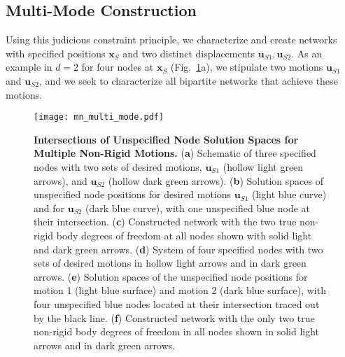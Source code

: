 \documentclass[%
preprint,
 amsmath,amssymb,
 aps,
]{revtex4-1}
\begin{document}
\subsection{Multi-Mode Construction}

Using this judicious constraint principle, we characterize and create networks with specified positions $\bm{x}_S$ and two distinct displacements $\bm{u}_{S1}, \bm{u}_{S2}$. As an example in $d = 2$ for four nodes at $\bm{x}_S$ (Fig.~\ref{fig:mn_multi}a), we stipulate two motions $\bm{u}_{S1}$ and $\bm{u}_{S2}$, and we seek to characterize all bipartite networks that achieve these motions. 

\begin{figure}[h!]
	\centering
	\texttt{[image: mn\_multi\_mode.pdf]}
	\caption{\textbf{Intersections of Unspecified Node Solution Spaces for Multiple Non-Rigid Motions.} (\textbf{a}) Schematic of three specified nodes with two sets of desired motions, $\bm{u}_{S1}$ (hollow light green arrows), and $\bm{u}_{S2}$ (hollow dark green arrows). (\textbf{b}) Solution spaces of unspecified node positions for desired motions $\bm{u}_{S1}$ (light blue curve) and for $\bm{u}_{S2}$ (dark blue curve), with one unspecified blue node at their intersection. (\textbf{c}) Constructed network with the two true non-rigid body degrees of freedom at all nodes shown with solid light and dark green arrows. (\textbf{d}) System of four specified nodes with two sets of desired motions in hollow light arrows and in dark green arrows. (\textbf{e}) Solution spaces of the unspecified node positions for motion 1 (light blue surface) and motion 2 (dark blue surface), with four unspecified blue nodes located at their intersection traced out by the black line. (\textbf{f}) Constructed network with the only two true non-rigid body degrees of freedom in all nodes shown in solid light arrows and in dark green arrows.}
	\label{fig:mn_multi}
\end{figure}
\end{document}
